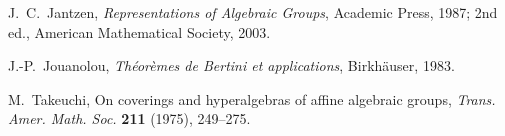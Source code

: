 \smallskip\noindent[Ja87]\enspace
J.~C.~Jantzen, \textit{Representations of Algebraic Groups}, Academic
Press, 1987; 2nd ed., American Mathematical Society, 2003.\par

\smallskip\noindent[Jou83]\enspace
J.-P.~Jouanolou, \textit{Théorèmes de Bertini et applications},
Birkhäuser, 1983.\par

\smallskip\noindent[Ta75]\enspace
M.~Takeuchi, On coverings and hyperalgebras of affine algebraic
groups, \textit{Trans. Amer. Math. Soc.} \textbf{211} (1975),
249--275.\par




